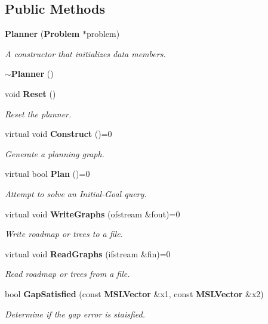 \subsection*{Public Methods}
\begin{CompactItemize}
\item 
{\bf Planner} ({\bf Problem} $\ast$problem)
\begin{CompactList}\small\item\em A constructor that initializes data members.\item\end{CompactList}\item 
{\bf $\sim$Planner} ()
\item 
void {\bf Reset} ()
\begin{CompactList}\small\item\em Reset the planner.\item\end{CompactList}\item 
virtual void {\bf Construct} ()=0
\begin{CompactList}\small\item\em Generate a planning graph.\item\end{CompactList}\item 
virtual bool {\bf Plan} ()=0
\begin{CompactList}\small\item\em Attempt to solve an Initial-Goal query.\item\end{CompactList}\item 
virtual void {\bf Write\-Graphs} (ofstream \&fout)=0
\begin{CompactList}\small\item\em Write roadmap or trees to a file.\item\end{CompactList}\item 
virtual void {\bf Read\-Graphs} (ifstream \&fin)=0
\begin{CompactList}\small\item\em Read roadmap or trees from a file.\item\end{CompactList}\item 
bool {\bf Gap\-Satisfied} (const {\bf MSLVector} \&x1, const {\bf MSLVector} \&x2)
\begin{CompactList}\small\item\em Determine if the gap error is staisfied.\item\end{CompactList}\end{CompactItemize}
